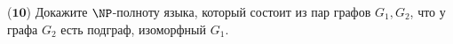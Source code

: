 ($\mathbf{10}$)
Докажите $\NP$-полноту языка, который состоит из пар графов $G_1,G_2$, что у графа $G_2$ есть подграф, изоморфный $G_1$.